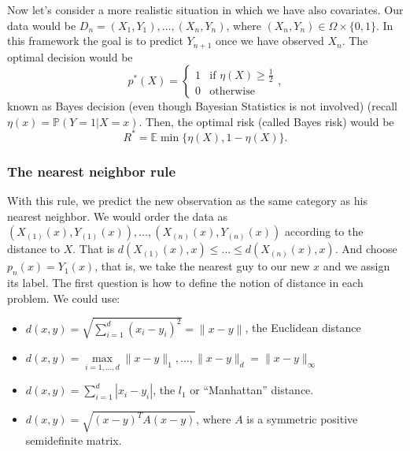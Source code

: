 \documentclass[11pt, english]{article}
\begin{document}
Now let's consider a more realistic situation in which we have also covariates. Our data would be $D_n=(X_1,Y_1),\dots,(X_n,Y_n)$, where $(X_n,Y_n)\in\Omega\times\{0,1\}$. In this framework the goal is to predict $Y_{n+1}$ once we have observed $X_n$. The optimal decision would be 
\begin{equation}
	p^*(X)=\left\{\begin{array}{ll}
	1 & \text{if }\eta(X)\geq\frac{1}{2}\\
	0 & \text{otherwise} 
	\end{array}\right.,
\end{equation}
known as Bayes decision (even though Bayesian Statistics is not involved) (recall $\eta(x)=\mathbb{P}(Y=1|X=x)$. Then, the optimal risk (called Bayes risk) would be 
\begin{equation}
	R^*=\mathbb{E}\min\{\eta(X),1-\eta(X)\}.
\end{equation}

\subsubsection{The nearest neighbor rule}

With this rule, we predict the new observation as the same category as his nearest neighbor. We would order the data as $(X_{(1)}(x),Y_{(1)}(x)),\dots,(X_{(n)}(x),Y_{(n)}(x))$ according to the distance to $X$. That is $d(X_{(1)}(x),x)\leq\dots\leq d(X_{(n)}(x),x)$. And choose $p_n(x) = Y_1(x)$, that is, we take the nearest guy to our new $x$ and we assign its label. The first question is how to define the notion of distance in each problem. We could use:
\begin{itemize}
\item $d(x,y) = \sqrt{\sum_{i=1}^{d}(x_i - y_i)^2} = \|x - y\|$, the Euclidean distance
\item $d(x,y)= \max\limits_{i=1,\dots,d}\|x-y\|_1,\dots,\|x-y\|_d=\|x-y\|_{\infty}$
\item $d(x,y) = \sum_{i=1}^{d} |x_i - y_i|$, the $l_1$ or ``Manhattan'' distance.
\item $d(x,y)=\sqrt{(x-y)^TA(x-y)}$, where $A$ is a symmetric positive semidefinite matrix.
\end{itemize}
\end{document}
